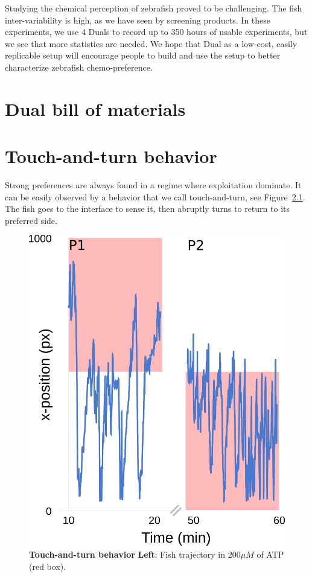   Studying the chemical perception of zebrafish proved to be challenging. The fish inter-variability is high, as we have seen by screening products. In these experiments, we use 4 Duals to record up to 350 hours of usable experiments, but we see that more statistics are needed. We hope that Dual as a low-cost, easily replicable setup will encourage people to build and use the setup to better characterize zebrafish chemo-preference.


\begin{appendices}

  \chapter{Dual bill of materials}
  
  \label{bom}

  \chapter{Touch-and-turn behavior}
    \label{touch_turn}
    Strong preferences are always found in a regime where exploitation dominate. It can be easily observed by a behavior that we call touch-and-turn, see Figure~\ref{touchandturn}. The fish goes to the interface to sense it, then abruptly turns to return to its preferred side.

      \begin{figure}[h]
        \centering
        \includegraphics[width=1\textwidth]{part_2/assets/trace.png}
        \caption{\textbf{Touch-and-turn behavior} \textbf{Left}: Fish trajectory in $200 \mu M$ of ATP (red box).}
        \label{touchandturn}
      \end{figure}



\end{appendices}
